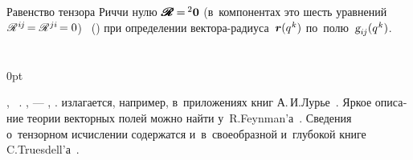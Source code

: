 \begin{otherlanguage}{russian}
Равенство тензора Риччи нулю
${\hspace{.1ex}\pmb{\scalebox{1.2}[1]{$\mathscr{R}$}} \hspace{-0.16ex} = \hspace{-0.2ex} {^2\bm{0}}}$ (в~компонентах это шесть уравнений ${\hspace{.1ex}\mathscr{R}^{\hspace{.1ex}i\hspace{-0.1ex}j} \hspace{-0.3ex} = \mathscr{R}^{\hspace{.1ex}ji} \hspace{-0.3ex} = 0}$)   ~() при определении вектора-радиуса~${\bm{r}(q^{\hspace{.1ex}k})}$ по~полю~${\textsl{g}_{i\hspace{-0.1ex}j}(q^{\hspace{.1ex}k})}$.

\end{otherlanguage}

\section*{\small \wordforbibliography}

\begin{changemargin}{\parindent}{0pt}
\fontsize{10}{12}\selectfont

\begin{otherlanguage}{russian}

, ~\cite{mcconnell-tensoranalysis, schouten-tensoranalysis, borisenko.tarapov, rashevsky-riemanniangeometry, sokolnikov-tensoranalysis}. ,  \:--- , .
  излагается, например, в~приложениях книг А.\,И.\;Лурье~\cite{lurie-nonlinearelasticity, lurie-theoryofelasticity}.
Яркое описание теории векторных полей можно найти у~R.\:Feynman’а~\cite{feynman-lecturesonphysics}.
Сведения о~тензорном исчислении содержатся и~в~своеобразной и~глубокой книге C.\:Truesdell’а~\cite{truesdell-firstcourse}.

\end{otherlanguage}

\end{changemargin}
